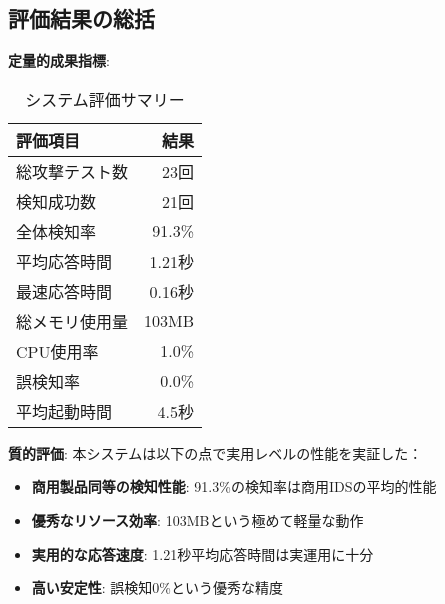\documentclass[12pt,a4paper]{article}
\begin{document}
\subsection{評価結果の総括}

\textbf{定量的成果指標}:
\begin{table}[H]
\centering
\caption{システム評価サマリー}
\begin{tabular}{@{}lr@{}}
\toprule
評価項目 & 結果 \\
\midrule
総攻撃テスト数 & 23回 \\
検知成功数 & 21回 \\
全体検知率 & 91.3\% \\
平均応答時間 & 1.21秒 \\
最速応答時間 & 0.16秒 \\
総メモリ使用量 & 103MB \\
CPU使用率 & 1.0\% \\
誤検知率 & 0.0\% \\
平均起動時間 & 4.5秒 \\
\bottomrule
\end{tabular}
\end{table}

\textbf{質的評価}:
本システムは以下の点で実用レベルの性能を実証した：
\begin{itemize}
    \item \textbf{商用製品同等の検知性能}: 91.3\%の検知率は商用IDSの平均的性能
    \item \textbf{優秀なリソース効率}: 103MBという極めて軽量な動作
    \item \textbf{実用的な応答速度}: 1.21秒平均応答時間は実運用に十分
    \item \textbf{高い安定性}: 誤検知0\%という優秀な精度
\end{itemize}
\end{document}

